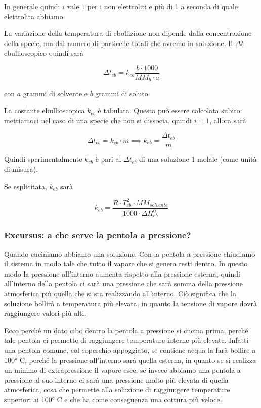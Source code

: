 In generale quindi $i$ vale 1 per i non elettroliti e più di 1 a seconda di quale elettrolita abbiamo.

\vspace{0.2cm}La variazione della temperatura di ebollizione non dipende dalla concentrazione della specie, ma dal numero di particelle totali che avremo in soluzione. Il $\Delta t$ ebullioscopico quindi sarà

$$\Delta t_{eb}=k_{eb} \frac{b \cdot 1000}{MM_b \cdot a}$$

con $a$ grammi di solvente e $b$ grammi di soluto.

La costante ebullioscopica $k_{eb}$ è tabulata. Questa può essere calcolata subito: mettiamoci nel caso di una specie che non si dissocia, quindi $i=1$, allora sarà

$$\Delta t_{eb}= k_{eb} \cdot m
\implies
k_{eb} = \frac{\Delta t_{eb}}{m}$$

Quindi sperimentalmente $k_{eb}$ è pari al $\Delta t_{eb}$ di una soluzione 1 molale (come unità di misura).

Se esplicitata, $k_{eb}$ sarà

$$k_{eb}=\frac{R \cdot T_{eb}^2 \cdot MM_{solvente}}{1000 \cdot \Delta H^0_{eb}}$$

\subsubsection{Excursus: a che serve la pentola a pressione?}
Quando cuciniamo abbiamo una soluzione. Con la pentola a pressione chiudiamo il sistema in modo tale che tutto il vapore che si genera resti dentro. In questo modo la pressione all'interno aumenta rispetto alla pressione esterna, quindi all'interno della pentola ci sarà una pressione che sarà somma della pressione atmosferica più quella che si sta realizzando all'interno. Ciò significa che la soluzione bollirà a temperatura più elevata, in quanto la tensione di vapore dovrà raggiungere valori più alti.

Ecco perché un dato cibo dentro la pentola a pressione si cucina prima, perché tale pentola ci permette di raggiungere temperature interne più elevate. Infatti una pentola comune, col coperchio appoggiato, se contiene acqua la farà bollire a 100° C, perché la pressione all'interno sarà quella esterna, in quanto se si realizza un minimo di extrapressione il vapore esce; se invece abbiamo una pentola a pressione al suo interno ci sarà una pressione molto più elevata di quella atmosferica, cosa che permette alla soluzione di raggiungere temperature superiori ai 100° C e che ha come conseguenza una cottura più veloce.
